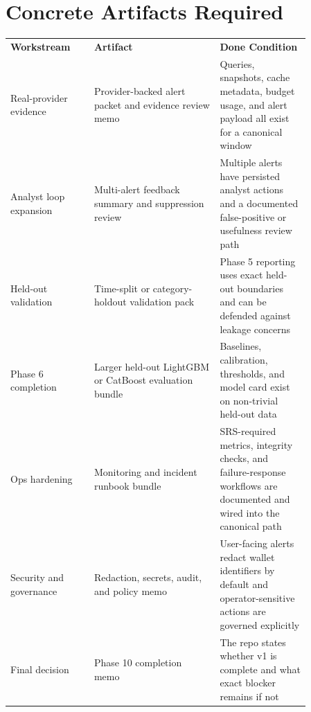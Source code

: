 \documentclass{article}
\begin{document}
\section*{Concrete Artifacts Required}
\begin{longtable}{p{0.24\linewidth}p{0.36\linewidth}p{0.26\linewidth}}
\textbf{Workstream} & \textbf{Artifact} & \textbf{Done Condition} \\
Real-provider evidence & Provider-backed alert packet and evidence review memo & Queries, snapshots, cache metadata, budget usage, and alert payload all exist for a canonical window \\
Analyst loop expansion & Multi-alert feedback summary and suppression review & Multiple alerts have persisted analyst actions and a documented false-positive or usefulness review path \\
Held-out validation & Time-split or category-holdout validation pack & Phase 5 reporting uses exact held-out boundaries and can be defended against leakage concerns \\
Phase 6 completion & Larger held-out LightGBM or CatBoost evaluation bundle & Baselines, calibration, thresholds, and model card exist on non-trivial held-out data \\
Ops hardening & Monitoring and incident runbook bundle & SRS-required metrics, integrity checks, and failure-response workflows are documented and wired into the canonical path \\
Security and governance & Redaction, secrets, audit, and policy memo & User-facing alerts redact wallet identifiers by default and operator-sensitive actions are governed explicitly \\
Final decision & Phase 10 completion memo & The repo states whether v1 is complete and what exact blocker remains if not \\
\end{longtable}
\end{document}
